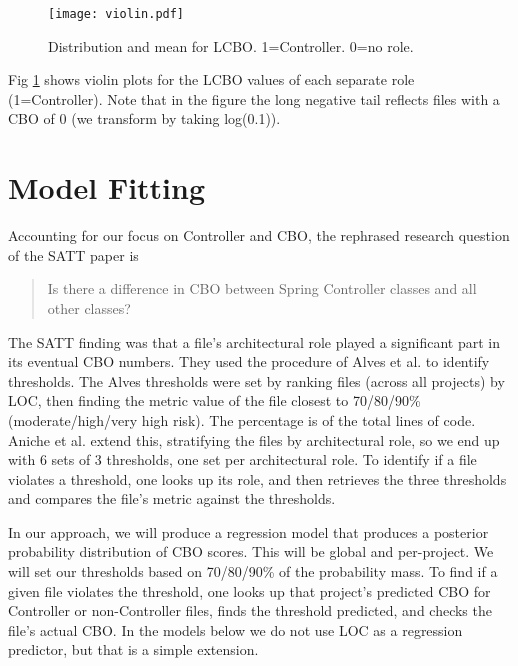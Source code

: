 \documentclass[sigconf,natbib=false]{acmart}
\begin{document}
\begin{figure}[tb]
	\centering
	\texttt{[image: violin.pdf]}
	\caption{Distribution and mean for LCBO. 1=Controller. 0=no role.}
	\label{fig:violin}
\end{figure}

Fig \ref{fig:violin} shows violin plots for the LCBO values of each separate role (1=Controller). Note that in the figure the long negative tail reflects files with a CBO of 0 (we transform by taking log(0.1)).

\section{Model Fitting}
Accounting for our focus on Controller and CBO, the rephrased research question of the SATT paper is
\begin{quote}
Is there a difference in CBO between Spring Controller classes and all other classes?
\end{quote}
The SATT finding was that a file's architectural role played a significant part in its eventual CBO numbers. They used the procedure of Alves et al. \cite{alves2010deriving} to identify thresholds. The Alves thresholds were set by ranking files (across all projects) by LOC, then finding the metric value of the file closest to 70/80/90\% (moderate/high/very high risk). The percentage is of the total lines of code. Aniche et al. extend this, stratifying the files by architectural role, so we end up with 6 sets of 3 thresholds, one set per architectural role. To identify if a file violates a threshold, one looks up its role, and then retrieves the three thresholds and compares the file's metric against the thresholds.

In our approach, we will produce a regression model that produces a posterior probability distribution of CBO scores. This will be global and per-project. We will set our thresholds based on 70/80/90\% of the probability mass. To find if a given file violates the threshold, one looks up that project's predicted CBO for Controller or non-Controller files, finds the threshold predicted, and checks the file's actual CBO. In the models below we do not use LOC as a regression predictor, but that is a simple extension.
\end{document}
